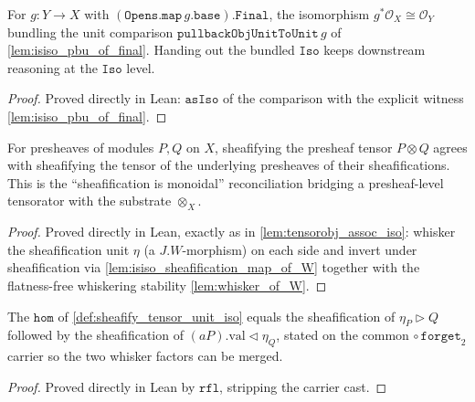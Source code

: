 \begin{definition}\leanok
  \label{def:pullback_obj_unit_to_unit_iso}
  For \(g : Y \to X\) with \((\mathtt{Opens.map}\,g.\mathtt{base}).\mathtt{Final}\), the
  isomorphism \(g^*\mathcal{O}_X \cong \mathcal{O}_Y\) bundling the unit comparison
  \(\mathtt{pullbackObjUnitToUnit}\,g\) of \cref{lem:isiso_pbu_of_final}. Handing out the
  bundled \(\mathtt{Iso}\) keeps downstream reasoning at the \(\mathtt{Iso}\) level.
\end{definition}
\begin{proof}
  \leanok
  Proved directly in Lean: \(\mathtt{asIso}\) of the comparison with the explicit witness
  \cref{lem:isiso_pbu_of_final}.
\end{proof}

\begin{definition}\leanok
  \label{def:sheafify_tensor_unit_iso}
  For presheaves of modules \(P,Q\) on \(X\), sheafifying the presheaf tensor \(P \otimes Q\)
  agrees with sheafifying the tensor of the underlying presheaves of their sheafifications.
  This is the ``sheafification is monoidal'' reconciliation bridging a presheaf-level
  tensorator with the substrate \(\otimes_X\).
\end{definition}
\begin{proof}
  \leanok
  Proved directly in Lean, exactly as in \cref{lem:tensorobj_assoc_iso}: whisker the
  sheafification unit \(\eta\) (a \(J.W\)-morphism) on each side and invert under
  sheafification via \cref{lem:isiso_sheafification_map_of_W} together with the
  flatness-free whiskering stability \cref{lem:whisker_of_W}.
\end{proof}

\begin{lemma}\leanok
  \label{lem:sheafify_tensor_unit_iso_hom_eq}
  The \(\mathtt{hom}\) of \cref{def:sheafify_tensor_unit_iso} equals the sheafification of
  \(\eta_P \rhd Q\) followed by the sheafification of \((aP).\mathrm{val} \lhd \eta_Q\),
  stated on the common \(\circ\,\mathtt{forget}_2\) carrier so the two whisker factors can
  be merged.
\end{lemma}
\begin{proof}
  \leanok
  Proved directly in Lean by \(\mathtt{rfl}\), stripping the carrier cast.
\end{proof}

